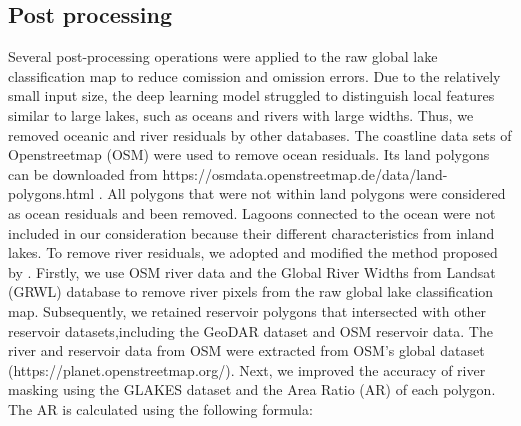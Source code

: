 \documentclass[preprint,12pt,authoryear]{elsarticle}
\begin{document}
\subsection{Post processing}
\label{subsec4}

Several post-processing operations were applied to the raw global lake classification map to reduce comission and omission errors. Due to the relatively small input size, the deep learning model struggled to distinguish local features similar to large lakes, such as oceans and rivers with large widths. Thus, we removed oceanic and river residuals by other databases. The coastline data sets of Openstreetmap (OSM) \citep{goodchild_citizens_2007} were used to remove ocean residuals. Its land polygons can be downloaded from https://osmdata.openstreetmap.de/data/land-polygons.html . All polygons that were not within land polygons were considered as ocean residuals and been removed. Lagoons connected to the ocean were not included in our consideration because their different characteristics from inland lakes. To remove river residuals, we adopted and modified the method proposed by \citet{pi_mapping_2022}. Firstly, we use OSM river data and the Global River Widths from Landsat (GRWL)\citep{allen_global_2018} database to remove river pixels from the raw global lake classification map. Subsequently, we retained reservoir polygons that intersected with other reservoir datasets,including the GeoDAR dataset \citep{wang_surface_2025} and OSM reservoir data. The river and reservoir data from OSM were extracted from OSM's global dataset (https://planet.openstreetmap.org/). Next, we improved the accuracy of river masking using the GLAKES dataset and the Area Ratio (AR) of each polygon. The AR is calculated using the following formula:
\end{document}

